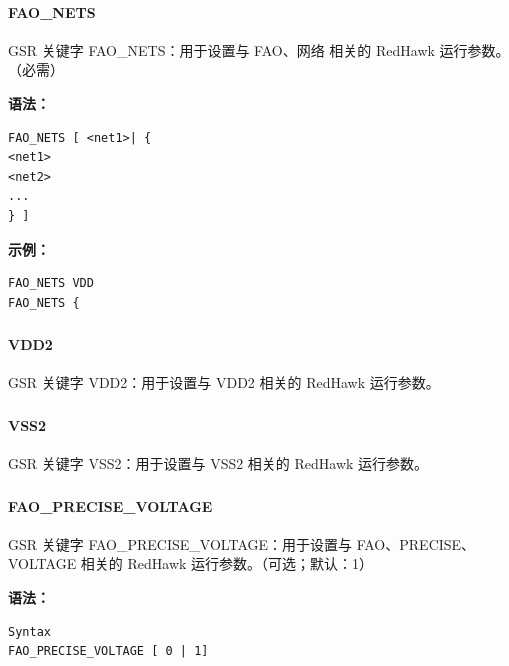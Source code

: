 \paragraph*{FAO_NETS}

GSR 关键字 FAO_NETS：用于设置与 FAO、网络 相关的 RedHawk 运行参数。（必需）

\textbf{语法：}
\begin{lstlisting}
FAO_NETS [ <net1>| {
<net1>
<net2>
...
} ]
\end{lstlisting}

\textbf{示例：}
\begin{lstlisting}
FAO_NETS VDD
FAO_NETS {
\end{lstlisting}

\subsubsection{}
\paragraph*{VDD2}

GSR 关键字 VDD2：用于设置与 VDD2 相关的 RedHawk 运行参数。

\subsubsection{}
\paragraph*{VSS2}

GSR 关键字 VSS2：用于设置与 VSS2 相关的 RedHawk 运行参数。

\subsubsection{}
\paragraph*{FAO_PRECISE_VOLTAGE}

GSR 关键字 FAO_PRECISE_VOLTAGE：用于设置与 FAO、PRECISE、VOLTAGE 相关的 RedHawk 运行参数。（可选；默认：1）

\textbf{语法：}
\begin{lstlisting}
Syntax
FAO_PRECISE_VOLTAGE [ 0 | 1]
\end{lstlisting}

\subsubsection{}
